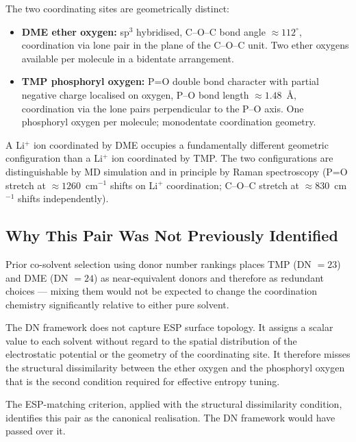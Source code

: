 \documentclass[11pt]{article}
\theoremstyle{plain}
\theoremstyle{definition}
\theoremstyle{remark}
\begin{document}
The two coordinating sites are geometrically distinct:

\begin{itemize}[leftmargin=2em]
  \item \textbf{DME ether oxygen:} sp$^3$ hybridised, C--O--C bond angle
        $\approx 112^\circ$, coordination via lone pair in the plane of the
        C--O--C unit.  Two ether oxygens available per molecule in a
        bidentate arrangement.
  \item \textbf{TMP phosphoryl oxygen:} P=O double bond character with
        partial negative charge localised on oxygen, P--O bond length
        $\approx 1.48$~\AA, coordination via the lone pairs perpendicular
        to the P--O axis.  One phosphoryl oxygen per molecule;
        monodentate coordination geometry.
\end{itemize}

A Li$^+$ ion coordinated by DME occupies a fundamentally different geometric
configuration than a Li$^+$ ion coordinated by TMP.  The two configurations
are distinguishable by MD simulation and in principle by Raman spectroscopy
(P=O stretch at $\approx 1260$~cm$^{-1}$ shifts on Li$^+$ coordination;
C--O--C stretch at $\approx 830$~cm$^{-1}$ shifts independently).

\subsection{Why This Pair Was Not Previously Identified}

Prior co-solvent selection using donor number rankings places TMP (DN $= 23$)
and DME (DN $= 24$) as near-equivalent donors and therefore as redundant
choices --- mixing them would not be expected to change the coordination
chemistry significantly relative to either pure solvent.

The DN framework does not capture ESP surface topology.  It assigns a scalar
value to each solvent without regard to the spatial distribution of the
electrostatic potential or the geometry of the coordinating site.  It
therefore misses the structural dissimilarity between the ether oxygen
and the phosphoryl oxygen that is the second condition required for
effective entropy tuning.

The ESP-matching criterion, applied with the structural dissimilarity
condition, identifies this pair as the canonical realisation.  The DN
framework would have passed over it.

\end{document}
